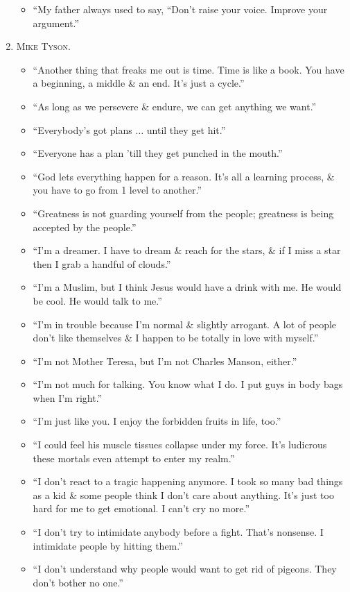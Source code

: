 \documentclass{article}
\begin{document}
\begin{enumerate}
\begin{itemize}
		\item ``My father always used to say, ``Don't raise your voice. Improve your argument.''
	\end{itemize}
	\item \textsc{Mike Tyson.}
	\begin{itemize}
		\item ``Another thing that freaks me out is time. Time is like a book. You have a beginning, a middle \& an end. It's just a cycle.''
		\item ``As long as we persevere \& endure, we can get anything we want.''
		\item ``Everybody's got plans $\ldots$ until they get hit.''
		\item ``Everyone has a plan 'till they get punched in the mouth.''
		\item ``God lets everything happen for a reason. It's all a learning process, \& you have to go from 1 level to another.''
		\item ``Greatness is not guarding yourself from the people; greatness is being accepted by the people.''
		\item ``I'm a dreamer. I have to dream \& reach for the stars, \& if I miss a star then I grab a handful of clouds.''
		\item ``I'm a Muslim, but I think Jesus would have a drink with me. He would be cool. He would talk to me.''
		\item ``I'm in trouble because I'm normal \& slightly arrogant. A lot of people don't like themselves \& I happen to be totally in love with myself.''
		\item ``I'm not Mother Teresa, but I'm not Charles Manson, either.''
		\item ``I'm not much for talking. You know what I do. I put guys in body bags when I'm right.''
		\item ``I'm just like you. I enjoy the forbidden fruits in life, too.''
		\item ``I could feel his muscle tissues collapse under my force. It's ludicrous these mortals even attempt to enter my realm.''
		\item ``I don't react to a tragic happening anymore. I took so many bad things as a kid \& some people think I don't care about anything. It's just too hard for me to get emotional. I can't cry no more.''
		\item ``I don't try to intimidate anybody before a fight. That's nonsense. I intimidate people by hitting them.''
		\item ``I don't understand why people would want to get rid of pigeons. They don't bother no one.''

\end{itemize}
\end{enumerate}
\end{document}
